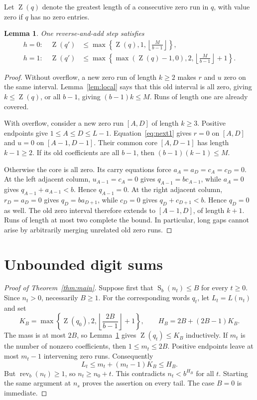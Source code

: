 \documentclass[11pt]{article}
\newtheorem{lemma}[theorem]{Lemma}
\newcommand{\rev}{\operatorname{rev}}
\newcommand{\ds}{\operatorname{S}}
\newcommand{\zg}{\operatorname{Z}}
\begin{document}
Let $\zg(q)$ denote the greatest length of a consecutive zero run in $q$,
with value zero if $q$ has no zero entries.
\begin{lemma}\label{lem:gaps}
One reverse-and-add step satisfies
\begin{align}
 h=0:\quad \zg(q')&\leq
 \max\left\{\zg(q),1,\left\lfloor\frac{M}{b-1}\right\rfloor\right\},
 \label{eq:gap0}\\
 h=1:\quad \zg(q')&\leq
 \max\left\{\max(\zg(q)-1,0),2,
                   \left\lfloor\frac{M}{b-1}\right\rfloor+1\right\}.
 \label{eq:gap1}
\end{align}
\end{lemma}
\begin{proof}
Without overflow, a new zero run of length $k\geq2$ makes $r$ and $u$
zero on the same interval. Lemma~\ref{lem:local} says that this old
interval is all zero, giving $k\leq\zg(q)$, or all $b-1$, giving
$(b-1)k\leq M$. Runs of length one are already covered.

With overflow, consider a new zero run $[A,D]$ of length $k\geq3$.
Positive endpoints give $1\leq A\leq D\leq L-1$.
Equation~\eqref{eq:next1} gives $r=0$ on $[A,D]$ and $u=0$ on
$[A-1,D-1]$. Their common core $[A,D-1]$ has length $k-1\geq2$.
If its old coefficients are all $b-1$, then $(b-1)(k-1)\leq M$.

Otherwise the core is all zero. Its carry equations force
$a_A=a_D=c_A=c_D=0$. At the left adjacent column,
$u_{A-1}=c_A=0$ gives $q_{A-1}=b c_{A-1}$, while $a_A=0$ gives
$q_{A-1}+a_{A-1}<b$. Hence $q_{A-1}=0$.
At the right adjacent column, $r_D=a_D=0$ gives $q_D=b a_{D+1}$,
while $c_D=0$ gives $q_D+c_{D+1}<b$. Hence $q_D=0$ as well.
The old zero interval therefore extends to $[A-1,D]$, of length $k+1$.
Runs of length at most two complete the bound. In particular, long gaps
cannot arise by arbitrarily merging unrelated old zero runs.
\end{proof}

\section{Unbounded digit sums}
\begin{proof}[Proof of Theorem~\ref{thm:main}]
Suppose first that $\ds_b(n_t)\leq B$ for every $t\geq0$.
Since $n_t>0$, necessarily $B\geq1$. For the corresponding words $q_t$,
let $L_t=L(n_t)$ and set
\begin{equation}\label{eq:KH}
 K_B=\max\left\{\zg(q_0),2,
                  \left\lfloor\frac{2B}{b-1}\right\rfloor+1\right\},
 \qquad H_B=2B+(2B-1)K_B.
\end{equation}
The mass is at most $2B$, so Lemma~\ref{lem:gaps} gives
$\zg(q_t)\leq K_B$ inductively. If $m_t$ is the number of nonzero
coefficients, then $1\leq m_t\leq2B$. Positive endpoints leave at most
$m_t-1$ intervening zero runs. Consequently
\begin{equation}\label{eq:length}
 L_t\leq m_t+(m_t-1)K_B\leq H_B.
\end{equation}
But $\rev_b(n_t)\geq1$, so $n_t\geq n_0+t$. This contradicts
$n_t<b^{H_B}$ for all $t$. Starting the same argument at $n_s$ proves
the assertion on every tail. The case $B=0$ is immediate.
\end{proof}
\end{document}
